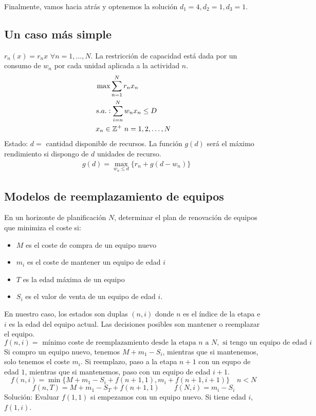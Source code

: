 \documentclass[MIOP.tex]{subfiles}
\begin{document}
\begin{solucion}
\begin{center}
\begin{tabular}{|c|c|c|c|c|}
\end{tabular}
\end{center}

Finalmente, vamos hacia atrás y optenemos la solución $d_1=4, d_2=1, d_3=1$. 
\end{solucion}

\subsection{Un caso más simple}

$r_n(x)=r_nx$ $\forall n=1,\dots, N$. La restricción de capacidad está dada por un consumo de $w_n$ por cada unidad aplicada a la actividad $n$. 
\begin{align*}
&\max \sum_{n=1}^N r_nx_n\\
&s.a.: \sum_{i=n}^N w_nx_n\leq D\\
&      x_n\in\mathbb{Z}^+\ n=1,2,\dots,N
\end{align*}
Estado: $d=$ cantidad disponible de recursos. La función $g(d)$ será el máximo rendimiento si dispongo de $d$ unidades de recurso. 
\begin{align*}
&g(d)=\max_{w_n\leq d}\{r_n+g(d-w_n)\}
\end{align*}
\subsection{Modelos de reemplazamiento de equipos}
En un horizonte de planificación $N$, determinar el plan de renovación de equipos que minimiza el coste si:
\begin{itemize}
\item $M$ es el coste de compra de un equipo nuevo
\item $m_i$ es el coste de mantener un equipo de edad $i$
\item $T$ es la edad máxima de un equipo
\item $S_i$ es el valor de venta de un equipo de edad $i$.
\end{itemize}
En nuestro caso, los estados son duplas $(n,i)$ donde $n$ es el índice de la etapa e $i$ es la edad del equipo actual. Las decisiones posibles son mantener o reemplazar el equipo. 
$$
f(n,i) = \text{ mínimo coste de reemplazamiento desde la etapa }n\text{ a }N,\text{ si tengo un equipo de edad }i$$
Si compro un equipo nuevo, tenemos $M+m_1-S_i$, mientras que si mantenemos, solo tenemos el coste $m_i$. Si reemplazo, paso a la etapa $n+1$ con un equpo de edad $1$, mientras que si mantenemos, paso con un equipo de edad $i+1$.
$$
f(n,i)=\min\{M+m_1-S_i+f(n+1,1),m_i+f(n+1,i+1)\}\quad n<N
$$
$$
f(n,T) = M+m_1-S_T + f(n+1,1) \qquad f(N,i) = m_i-S_i
$$
Solución: Evaluar $f(1,1)$ si empezamos con un equipo nuevo. Si tiene edad $i$, $f(1,i)$. 
\end{document}
